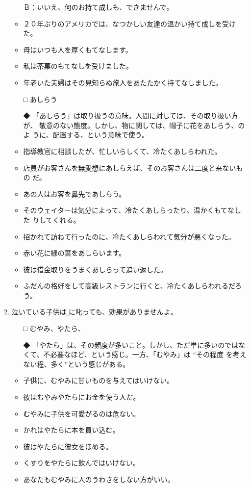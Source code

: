\documentclass[
uplatex,
b5paper,
10pt,
dvipdfmx
]{jsbook}
\begin{document}
\begin{enumerate}
\begin{itemize}
      Ｂ：いいえ、何のお持て成しも、できませんで。

\item ２０年ぶりのアメリカでは、なつかしい友達の温かい持て成しを受けた。
\item 母はいつも人を厚くもてなします。
\item 私は茶菓のもてなしを受けました。
\item 年老いた夫婦はその見知らぬ旅人をあたたかく持てなしました。
\end{itemize}

\begin{itemize}
\item[□] あしらう
\item[◆] 「あしらう」は取り扱うの意味。人間に対しては、その取り扱い方が、
	  敬意のない態度。しかし、物に関しては、帽子に花をあしらう、のよ
	  うに、配置する、という意味で使う。
\end{itemize}
\begin{itemize}
\item 指導教官に相談したが、忙しいらしくて、冷たくあしらわれた。
\item 店員がお客さんを無愛想にあしらえば、そのお客さんは二度と来ないもの
      だ。
\item あの人はお客を鼻先であしらう。
\item そのウェイターは気分によって、冷たくあしらったり、温かくもてなした
      りしてくれる。
\item 招かれて訪ねて行ったのに、冷たくあしらわれて気分が悪くなった。
\item 赤い花に緑の葉をあしらいます。
\item 彼は借金取りをうまくあしらって追い返した。
\item ふだんの格好をして高級レストランに行くと、冷たくあしらわれるだろう。
\end{itemize}

\item 泣いている子供は\underline{     }に叱っても、効果がありませんよ。
\begin{itemize}
\item[□] むやみ、やたら、
\item[◆] 「やたら」は、その頻度が多いこと。しかし、ただ単に多いのではな
	  くて、不必要なほど、という感じ。一方、「むやみ」は ``その程度
	  を考えない程、多く''という感じがある。
\end{itemize}
\begin{itemize}
\item 子供に、むやみに甘いものを与えてはいけない。
\item 彼はむやみやたらにお金を使う人だ。
\item むやみに子供を可愛がるのは危ない。
\item かれはやたらに本を買い込む。
\item 彼はやたらに彼女をほめる。
\item くすりをやたらに飲んではいけない。
\item あなたもむやみに人のうわさをしない方がいい。
\end{itemize}


\end{enumerate}
\end{document}
